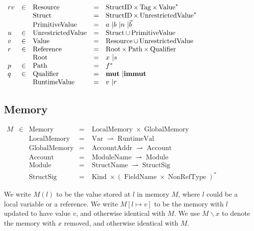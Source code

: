 \documentclass{article}
\newcommand{\tmop}[1]{\ensuremath{\operatorname{#1}}}
\newcommand{\tmstrong}[1]{\textbf{#1}}
\begin{document}
$\begin{array}{lllll}
  r v & \in & \tmop{Resource} & = & \tmop{StructID} \times \tmop{Tag} \times
  \tmop{Value}^{\ast}\\
  &  & \tmop{Struct} & = & \tmop{StructID} \times
  \tmop{UnrestrictedValue}^{\ast}\\
  &  & \tmop{PrimitiveValue} & = & \text{$a$ \textbar $b$ \textbar $n$
  \textbar $\vec{b}$}\\
  u & \in & \tmop{UnrestrictedValue} & = & \tmop{Struct} \cup
  \tmop{PrimitiveValue}\\
  v & \in & \tmop{Value} & = & \tmop{Resource} \cup \tmop{UnrestrictedValue}\\
  r & \in & \tmop{Reference} & = & \tmop{Root} \times \tmop{Path} \times
  \tmop{Qualifier}\\
  &  & \tmop{Root} & = & \text{$x$ \textbar $s$}\\
  p & \in & \tmop{Path} & = & f^{\ast}\\
  q & \in & \tmop{Qualifier} & = & \text{{\tmstrong{mut}} \textbar
  {\tmstrong{immut}}}\\
  &  & \tmop{RuntimeValue} & = & \text{$v$ \textbar $r$}
\end{array}$

\subsection{Memory}

$\begin{array}{lllll}
  M & \in & \tmop{Memory} & = & \tmop{LocalMemory} \times
  \tmop{GlobalMemory}\\
  &  & \tmop{LocalMemory} & = & \tmop{Var} \rightharpoonup
  \tmop{RuntimeVal}\\
  &  & \tmop{GlobalMemory} & = & \tmop{AccountAddr} \rightharpoonup
  \tmop{Account}\\
  &  & \tmop{Account} & = & \tmop{ModuleName} \rightharpoonup \tmop{Module}\\
  &  & \tmop{Module} & = & \tmop{StructName} \rightharpoonup
  \tmop{StructSig}\\
  &  & \tmop{StructSig} & = & \tmop{Kind} \times (\tmop{FieldName} \times
  \tmop{NonRefType})^{\ast}
\end{array}$

We write $M (l)$ to be the value stored at $l$ in memory $M$, where $l$ could
be a local variable or a reference. We write $M [l \mapsto v]$ to be the
memory with $l$ updated to have value $v$, and otherwise identical with $M$.
We use $M\backslash x$ to denote the memory with $x$ removed, and otherwise
identical with $M$.
\end{document}
